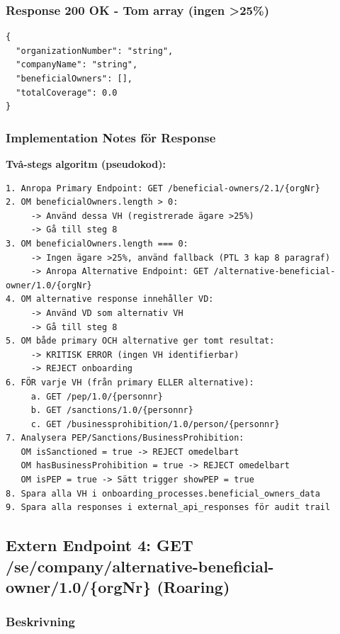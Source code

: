 \documentclass[12pt,a4paper]{article}
\begin{document}
\subsubsection{Response 200 OK - Tom array (ingen >25\%)}
\begin{lstlisting}
{
  "organizationNumber": "string",
  "companyName": "string",
  "beneficialOwners": [],
  "totalCoverage": 0.0
}
\end{lstlisting}

\subsubsection{Implementation Notes för Response}

\textbf{Två-stegs algoritm (pseudokod):}
\begin{lstlisting}
1. Anropa Primary Endpoint: GET /beneficial-owners/2.1/{orgNr}
2. OM beneficialOwners.length > 0:
     -> Använd dessa VH (registrerade ägare >25%)
     -> Gå till steg 8
3. OM beneficialOwners.length === 0:
     -> Ingen ägare >25%, använd fallback (PTL 3 kap 8 paragraf)
     -> Anropa Alternative Endpoint: GET /alternative-beneficial-owner/1.0/{orgNr}
4. OM alternative response innehåller VD:
     -> Använd VD som alternativ VH
     -> Gå till steg 8
5. OM både primary OCH alternative ger tomt resultat:
     -> KRITISK ERROR (ingen VH identifierbar)
     -> REJECT onboarding
6. FÖR varje VH (från primary ELLER alternative):
     a. GET /pep/1.0/{personnr}
     b. GET /sanctions/1.0/{personnr}
     c. GET /businessprohibition/1.0/person/{personnr}
7. Analysera PEP/Sanctions/BusinessProhibition:
   OM isSanctioned = true -> REJECT omedelbart
   OM hasBusinessProhibition = true -> REJECT omedelbart
   OM isPEP = true -> Sätt trigger showPEP = true
8. Spara alla VH i onboarding_processes.beneficial_owners_data
9. Spara alla responses i external_api_responses för audit trail
\end{lstlisting}

\subsection{Extern Endpoint 4: GET /se/company/alternative-beneficial-owner/1.0/\{orgNr\} (Roaring)}

\subsubsection{Beskrivning}
\end{document}
